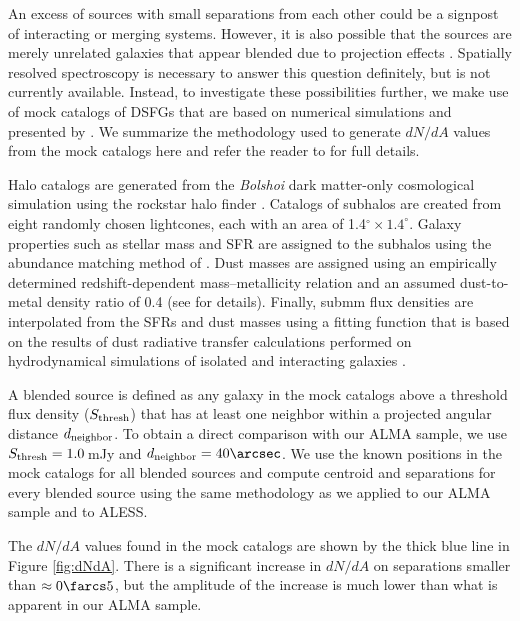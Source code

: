 \documentclass[iop]{emulateapj}
\begin{document}
An excess of sources with small separations from each other could be a signpost
of interacting or merging systems.  However, it is also possible that the
sources are merely unrelated galaxies that appear blended due to projection
effects \citep{HB13}.  Spatially resolved spectroscopy is necessary to answer
this question definitely, but is not currently available.  Instead, to
investigate these possibilities further, we make use of mock catalogs of DSFGs
that are based on numerical simulations and presented by \citet{HB13}.  We
summarize the methodology used to generate $dN/dA$ values from the mock catalogs
here and refer the reader to \citet{HB13} for full details. 

Halo catalogs are generated from the {\it Bolshoi} dark matter-only
cosmological simulation \citep{Klypin11} using the {\sc rockstar} halo finder
\citep{Behroozi13a,Behroozi13b}.  Catalogs of subhalos are created from eight
randomly chosen lightcones, each with an area of 1.4$^\circ \times 1.4^\circ$.
Galaxy properties such as stellar mass and SFR are assigned to the subhalos
using the abundance matching method of \citet{Behroozi13c}.  Dust masses are
assigned using an empirically determined redshift-dependent mass--metallicity
relation and an assumed dust-to-metal density ratio of 0.4 (see \citealt{HN13}
for details). Finally, submm flux densities are interpolated from the SFRs and
dust masses using a fitting function that is based on the results of dust
radiative transfer calculations performed on hydrodynamical simulations of
isolated and interacting galaxies \citep{H11,H12,HN13}.

A blended source is defined as any galaxy in the mock catalogs above a
threshold flux density ($S_{\rm thresh}$) that has at least one neighbor within
a projected angular distance $d_{\rm neighbor}$.  To obtain a direct comparison
with our ALMA sample, we use $S_{\rm thresh} = 1.0\,$mJy and $d_{\rm
neighbor} = 40\arcsec$.  We use the known positions in the mock catalogs for
all blended sources and compute centroid and separations for every blended
source using the same methodology as we applied to our ALMA sample and to
ALESS.  

The $dN/dA$ values found in the mock catalogs are shown by the
thick blue line in Figure \ref{fig:dNdA}.  There is a significant increase in
$dN/dA$ on separations smaller than $\approx 0\farcs5$, but the amplitude of
the increase is much lower than what is apparent in our ALMA sample. 
\end{document}
